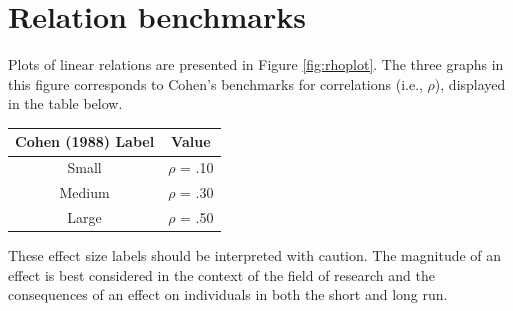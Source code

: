 \documentclass[
]{krantz}
\begin{document}
\hypertarget{relation-benchmarks}{%
\section{Relation benchmarks}\label{relation-benchmarks}}

Plots of linear relations are presented in Figure \ref{fig:rhoplot}. The three graphs in this figure corresponds to Cohen's benchmarks for correlations (i.e., \(\rho\)), displayed in the table below.

\begin{longtable}[]{@{}cc@{}}
\toprule
Cohen (1988) Label & Value\tabularnewline
\midrule
\endhead
Small & \(\rho\) = .10\tabularnewline
Medium & \(\rho\) = .30\tabularnewline
Large & \(\rho\) = .50\tabularnewline
\bottomrule
\end{longtable}

These effect size labels should be interpreted with caution. The magnitude of an effect is best considered in the context of the field of research and the consequences of an effect on individuals in both the short and long run.
\end{document}
